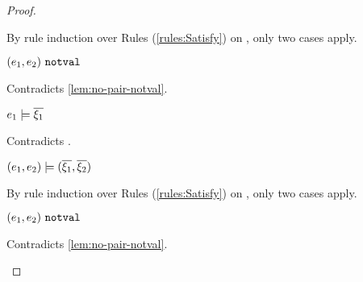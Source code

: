 \begin{proof}
\begin{byCases}
\begin{byCases}
\begin{byCases}
\begin{byCases}
\begin{byCases}
\begin{pfsteps*}
                    \end{pfsteps*}
                    By rule induction over Rules (\ref{rules:Satisfy}) on , only two cases apply.
                    \begin{byCases}
                    \item[\text{(\ref{rule:CSNotValPair})}]
                        \begin{pfsteps*}
                        \item $(e_1 , e_2) ~\mathtt{notval}$ 
                        \end{pfsteps*}
                        Contradicts \autoref{lem:no-pair-notval}.
                    \item[\text{(\ref{rule:CSPair})}]
                        \begin{pfsteps*}
                        \item $e_1 \models \overline{\xi_1}$ 
                        \end{pfsteps*}
                        Contradicts .
                    \end{byCases}
                \item[\text{(\ref{rule:CSOr2})}]
                    \begin{pfsteps*}
                    \item $(e_1 , e_2) \models (\overline{\xi_1} , \overline{\xi_2})$  
                    \end{pfsteps*}
                    By rule induction over Rules (\ref{rules:Satisfy}) on , only two cases apply.
                   \begin{byCases}
                    \item[\text{(\ref{rule:CSNotValPair})}]
                        \begin{pfsteps*}
                        \item $(e_1 , e_2) ~\mathtt{notval}$ 
                        \end{pfsteps*}
                        Contradicts \autoref{lem:no-pair-notval}.
                    \item[\text{(\ref{rule:CSPair})}]

\end{byCases}
\end{byCases}
\end{byCases}
\end{byCases}
\end{byCases}
\end{byCases}
\end{proof}
